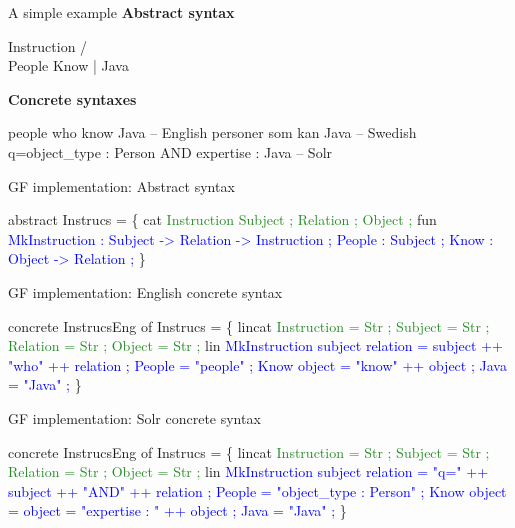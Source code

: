 \documentclass{beamer}
\begin{document}
\begin{frame}[fragile]{A simple example}
\textbf{Abstract syntax}
\begin{semiverbatim}
    Instruction
   /           \\
People        Know
                |
              Java
\end{semiverbatim}\pause

\textbf{Concrete syntaxes}
\begin{semiverbatim}
people who know Java                           -- English
personer som kan Java                          -- Swedish
q=object_type : Person AND expertise : Java    -- Solr
\end{semiverbatim}
\end{frame}

\begin{frame}[fragile]{GF implementation: Abstract syntax}
\begin{semiverbatim}
abstract Instrucs = \{  
  cat \textcolor{ForestGreen}{
    Instruction 
    Subject ;
    Relation ;
    Object ; }
  fun \textcolor{Blue}{
    MkInstruction : Subject -> Relation -> Instruction ;
    People : Subject ;
    Know : Object -> Relation ; }
\}
\end{semiverbatim}
\end{frame}

\begin{frame}[fragile]{GF implementation: English concrete syntax}
\begin{semiverbatim}
concrete InstrucsEng of Instrucs = \{
  lincat \textcolor{ForestGreen}{
    Instruction = Str ;
    Subject = Str ;
    Relation = Str ;
    Object = Str ; }
  lin \textcolor{Blue}{
    MkInstruction subject relation = 
                   subject ++ "who" ++ relation ;
    People = "people" ;
    Know object = "know" ++ object ;
    Java = "Java" ; }
\}
\end{semiverbatim}
\end{frame}

\begin{frame}[fragile]{GF implementation: Solr concrete syntax}
\begin{semiverbatim}
concrete InstrucsEng of Instrucs = \{
  lincat \textcolor{ForestGreen}{
    Instruction = Str ;
    Subject = Str ;
    Relation = Str ;
    Object = Str ; }
  lin \textcolor{Blue}{
    MkInstruction subject relation = 
                   "q=" ++ subject ++ "AND" ++ relation ;
    People = "object_type : Person" ;
    Know object = object = "expertise : " ++ object ;
    Java = "Java" ; }
\}
\end{semiverbatim}
\end{frame}
\end{document}

